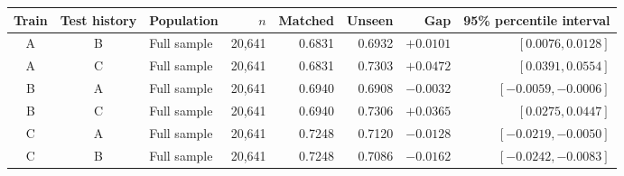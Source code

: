 \begin{tabular}{@{}cclrrrrr@{}}
\toprule
Train & Test history & Population & $n$ & Matched & Unseen & Gap & 95\% percentile interval \\
\midrule
A & B & Full sample & 20,641 & 0.6831 & 0.6932 & $+0.0101$ & $[0.0076, 0.0128]$ \\
A & C & Full sample & 20,641 & 0.6831 & 0.7303 & $+0.0472$ & $[0.0391, 0.0554]$ \\
B & A & Full sample & 20,641 & 0.6940 & 0.6908 & $-0.0032$ & $[-0.0059, -0.0006]$ \\
B & C & Full sample & 20,641 & 0.6940 & 0.7306 & $+0.0365$ & $[0.0275, 0.0447]$ \\
C & A & Full sample & 20,641 & 0.7248 & 0.7120 & $-0.0128$ & $[-0.0219, -0.0050]$ \\
C & B & Full sample & 20,641 & 0.7248 & 0.7086 & $-0.0162$ & $[-0.0242, -0.0083]$ \\
\bottomrule
\end{tabular}
